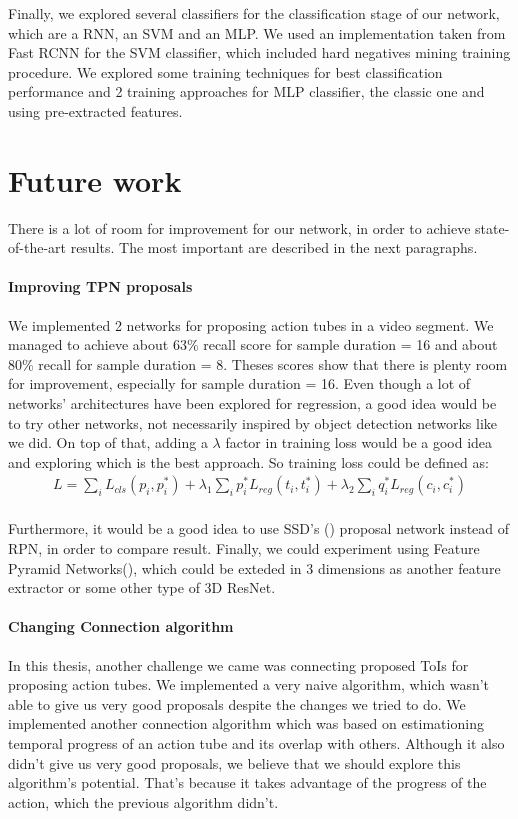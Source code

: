 Finally, we explored several classifiers for the classification stage of our network, which are a RNN, an SVM and an MLP.  We used an implementation taken from Fast RCNN
for the SVM classifier, which included hard negatives mining training procedure. We explored some training techniques for best classification performance and
2 training approaches for MLP classifier, the classic one and using pre-extracted features. 

\section{Future work}
There is a lot of room for improvement for our network, in order to achieve state-of-the-art results. The most important are described in the next paragraphs.

\paragraph{Improving TPN proposals} We implemented 2 networks for proposing action tubes in a video segment. We managed to achieve about 63\% recall score for
sample duration = 16 and about 80\% recall for sample duration = 8. Theses scores show that there is plenty room for improvement, especially for sample duration = 16.
Even though a lot of networks' architectures have been explored for regression, a good idea would be to try other networks, not necessarily inspired by object detection
networks like we did. On top of that, adding a $\lambda$ factor in training loss would be a good idea and exploring which is the best approach.
So training loss could be defined as:
\begin{equation} 
\begin{split}
 L  =  \sum_iL_{cls}(p_i, p_i^*) + \lambda_1 \sum_ip_i^*L_{reg}(t_i,t_i^*) + \lambda_2  \sum_iq_i^*L_{reg}(c_{i}, c_{i}^*) \\
\end{split}
\end{equation}

Furthermore, it would be a good idea to use SSD's (\cite{DBLP:journals/corr/LiuAESR15}) proposal network instead of RPN, in order to compare result. Finally,
we could experiment using Feature Pyramid Networks(\cite{8099589}), which could be exteded in 3 dimensions as another feature extractor or some other type of 3D ResNet.

\paragraph{Changing Connection algorithm}
In this thesis, another challenge we came was connecting proposed ToIs for proposing action tubes. We implemented a very naive algorithm, which wasn't
able to give us very good proposals despite the changes we tried to do. We implemented another connection algorithm which was based on estimationing temporal
progress of an action tube  and its overlap with others. Although it also didn't give us very good proposals, we believe that we should explore this algorithm's potential. That's
because it takes advantage of the progress of the action, which the previous algorithm didn't.

